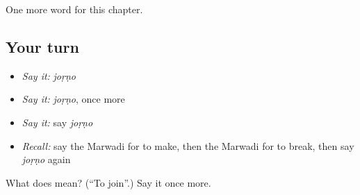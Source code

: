 \begin{grammarlens}[title={What you've built}]
One more word for this chapter.
\end{grammarlens}

\subsection*{Your turn}
\begin{itemize}
\raggedright
  \item \emph{Say it:} \emph{joṛṇo}
  \item \emph{Say it:} \emph{joṛṇo}, once more
  \item \emph{Say it:} say \emph{joṛṇo}
  \item \emph{Recall:} say the Marwadi for to make, then the Marwadi for to break, then say \emph{joṛṇo} again
\end{itemize}

\begin{tcolorbox}[breakable,colback=teal!4,colframe=teal!35!black,title={Before you move on}]
What does  mean? (\textquotedblleft{}To join\textquotedblright{}.) Say it once more.
\end{tcolorbox}
